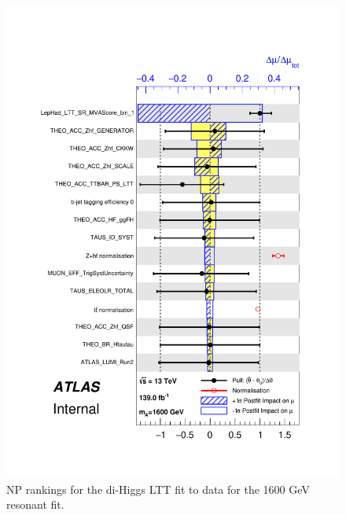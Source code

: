 \begin{figure}
\centering
\includegraphics[width=.8\textwidth]{figures/results/HH/LepHad/pulls_SigXsecOverSM_1600_LTT.pdf}
\caption{NP rankings for the di-Higgs \lephad LTT fit to data for the 1600 GeV resonant fit.}
\label{fig:LepHadPostfitNPRankings2HDM1600LTT}
\end{figure}

